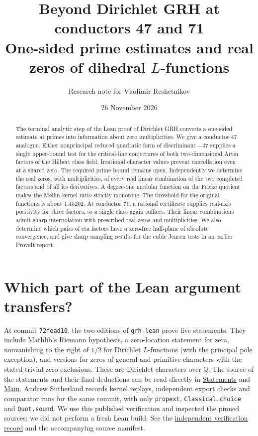 \documentclass[11pt]{article}
\title{\bfseries Beyond Dirichlet GRH at conductors 47 and 71\\[4pt]\large One-sided prime estimates and real zeros of dihedral $L$-functions}
\author{Research note for Vladimir Reshetnikov}
\date{26 November 2026}
\newcommand{\Q}{\mathbb Q}
\newcommand{\src}[2]{\href{https://github.com/lsernau/grh-lean/blob/72fead102f663d5c7a407964a13dc0cf9d977207/grh/#1}{#2}}
\begin{document}
\maketitle
\begin{abstract}
The terminal analytic step of the Lean proof of Dirichlet GRH converts a one-sided estimate at primes into information about zero multiplicities. We give a conductor-$47$ analogue. Either nonprincipal reduced quadratic form of discriminant $-47$ supplies a single upper-bound test for the critical-line conjectures of both two-dimensional Artin factors of the Hilbert class field. Irrational character values prevent cancellation even at a shared zero. The required prime bound remains open. Independently we determine the real zeros, with multiplicities, of every real linear combination of the two completed factors and of all its derivatives. A degree-one modular function on the Fricke quotient makes the Mellin-kernel ratio strictly monotone. The threshold for the original functions is about $1.45202$. At conductor $71$, a rational certificate supplies real-axis positivity for three factors, so a single class again suffices. Their linear combinations admit sharp interpolation with prescribed real zeros and multiplicities. We also determine which pairs of eta factors have a zero-free half-plane of absolute convergence, and give sharp sampling results for the cubic Jensen tests in an earlier ProveIt report.
\end{abstract}

\section{Which part of the Lean argument transfers?}
At commit \texttt{72fead10}, the two editions of \texttt{grh-lean} prove five statements. They include Mathlib's Riemann hypothesis, a zero-location statement for zeta, nonvanishing to the right of $1/2$ for Dirichlet $L$-functions (with the principal pole exception), and versions for zeros of general and primitive characters with the stated trivial-zero exclusions. These are Dirichlet characters over $\Q$. The source of the statements and their final deductions can be read directly in \src{src/Statements.lean}{Statements} and \src{src/Main.lean}{Main}. Andrew Sutherland records kernel replays, independent export checks and comparator runs for the same commit, with only \texttt{propext}, \texttt{Classical.choice} and \texttt{Quot.sound}. We use this published verification and inspected the pinned sources; we did not perform a fresh Lean build. See the \href{https://math.mit.edu/~drew/shortgrh/}{independent verification record} and the accompanying source manifest.
\end{document}
